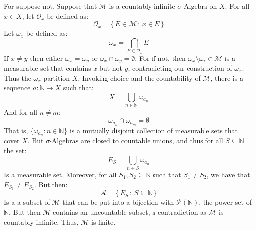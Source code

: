 \documentclass[crop=false,class=article]{standalone}                           %
\begin{document}
        \begin{solution}
            For suppose not. Suppose that $\mathcal{M}$ is a countably infinite
            $\sigma\textrm{-Algebra}$ on $X$. For all $x\in{X}$, let
            $\mathcal{O}_{x}$ be defined as:
            \begin{equation}
                \mathcal{O}_{x}=\big\{\,E\in\mathcal{M}\,:\,x\in{E}\,\}
            \end{equation}
            Let $\omega_{x}$ be defined as:
            \begin{equation}
                \omega_{x}=\bigcap_{E\in\mathcal{O}_{x}}E
            \end{equation}
            If $x\ne{y}$ then either $\omega_{x}=\omega_{y}$ or
            $\omega_{x}\cap\omega_{y}=\emptyset$. For if not, then
            $\omega_{x}\setminus\omega_{y}\in\mathcal{M}$ is a measurable set that
            contains $x$ but not $y$, contradicting our construction of
            $\omega_{x}$. Thus the $\omega_{x}$ partition $X$. Invoking choice and
            the countability of $\mathcal{M}$, there is a sequence
            $a:\mathbb{N}\rightarrow{X}$ such that:
            \begin{equation}
                X=\bigcup_{n\in\mathbb{N}}\omega_{a_{n}}
            \end{equation}
            And for all $n\ne{m}$:
            \begin{equation}
                \omega_{a_{n}}\cap\omega_{a_{m}}=\emptyset
            \end{equation}
            That is, $\{\omega_{a_{n}}:n\in\mathbb{N}\}$ is a mutually disjoint
            collection of measurable sets that cover $X$. But
            $\sigma\textrm{-Algebras}$ are closed to countable unions, and thus for
            all $S\subseteq\mathbb{N}$ the set:
            \begin{equation}
                E_{S}=\bigcup_{n\in{S}}\omega_{a_{n}}
            \end{equation}
            Is a measurable set. Moreover, for all $S_{1},S_{2}\subseteq\mathbb{N}$
            such that $S_{1}\ne{S}_{2}$, we have that $E_{S_{1}}\ne{E}_{{S}_{2}}$.
            But then:
            \begin{equation}
                \mathcal{A}=\big\{\,E_{S}\,:\,S\subseteq\mathbb{N}\,\}
            \end{equation}
            Is a a subset of $\mathcal{M}$ that can be put into a bijection with
            $\mathcal{P}(\mathbb{N})$, the power set of $\mathbb{N}$. But then
            $\mathcal{M}$ contains an uncountable subset, a contradiction as
            $\mathcal{M}$ is countably infinite. Thus, $\mathcal{M}$ is finite.
        \end{solution}
\end{document}
